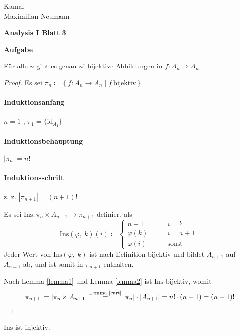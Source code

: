\documentclass[a4paper, 12pt]{scrartcl}
\newcounter{taski}
\newcommand{\task}{\stepcounter{taski}\textbf{Aufgabe \arabic{taski}}\\}
\begin{document}
\begin{flushright}
	Kamal\\
	Maximilian Neumann
\end{flushright}
\begin{center}
	\bfseries Analysis I Blatt 3
\end{center}
\task
\begin{theorem}
	Für alle $n$ gibt es genau $n!$ bijektive Abbildungen in $f:A_n \rightarrow A_n$
\end{theorem}
\begin{proof}
Es sei $\pi_n \coloneqq \left\{ f:A_n \rightarrow A_n \mid f\ \text{bijektiv} \right\}$
\paragraph*{Induktionsanfang} $n = 1$ , $\pi_1 = \{ \mathrm{id}_{A_1}\}$
\paragraph*{Induktionsbehauptung} $|\pi_n| = n!$
\paragraph*{Induktionsschritt} z. z. $|\pi_{n+1}| = (n+1)!$

Es sei $\mathrm{Ins}: \pi_n \times A_{n+1} \rightarrow \pi_{n+1}$ definiert als
\[ \mathrm{Ins}(\varphi,\ k)(i) \coloneqq \begin{cases}
	n+1 &\qquad i = k \\
	\varphi(k) &\qquad i = n+1 \\
	\varphi(i) &\qquad \text{sonst}
\end{cases} \]
Jeder Wert von $\mathrm{Ins}(\varphi,\ k)$ ist nach Definition bijektiv und bildet $A_{n+1}$ auf $A_{n+1}$ ab, und ist somit in $\pi_{n+1}$ enthalten.

Nach Lemma \ref{lemma1} und Lemma \ref{lemma2} ist $\mathrm{Ins}$ bijektiv, womit
\[ |\pi_{n+1}| = |\pi_n \times A_{n+1}| \stackrel{\text{Lemma \ref{cart}}}{=} |\pi_n| \cdot |A_{n+1}| = n! \cdot (n+1) = (n+1)! \]
\end{proof}
\begin{lemma}\label{lemma1}
$\mathrm{Ins}$ ist injektiv.
\end{lemma}
\end{document}
